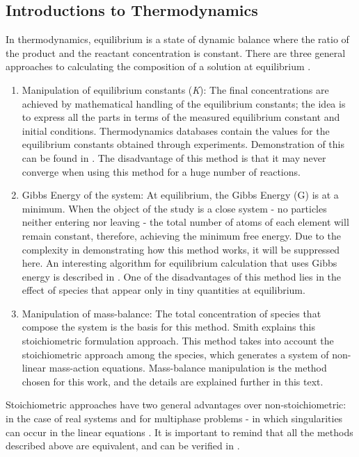 \documentclass[ppgc,mestrado,English]{iiufrgs}
\begin{document}
\subsection{Introductions to Thermodynamics}
In thermodynamics, equilibrium is a state of dynamic balance where the ratio of the product and the reactant concentration is constant. There are three general approaches to calculating the composition of a solution at equilibrium \cite{Petrucci:07}.
\begin{enumerate}
    \item Manipulation of equilibrium constants (\emph{K}): The final concentrations are achieved by mathematical handling of the equilibrium constants; the idea is to express all the parts in terms of the measured equilibrium constant and initial conditions. Thermodynamics databases contain the values for the equilibrium constants obtained through experiments. Demonstration of this can be found in \cite{Kehew:00}. The disadvantage of this method is that it may never converge when using this method for a huge number of reactions.
    \item Gibbs Energy of the system: At equilibrium, the Gibbs Energy (G) is at a minimum. When the object of the study is a close system - no particles neither entering nor leaving - the total number of atoms of each element will remain constant, therefore, achieving the minimum free energy. Due to the complexity in demonstrating how this method works, it will be suppressed here. An interesting algorithm for equilibrium calculation that uses Gibbs energy is described in \cite{Allan:15}. One of the disadvantages of this method lies in the effect of species that appear only in tiny quantities at equilibrium.
    \item Manipulation of mass-balance: The total concentration of species that compose the system is the basis for this method. Smith \cite{Smith:80} explains this stoichiometric formulation approach. This method takes into account the stoichiometric approach among the species, which generates a system of non-linear mass-action equations. Mass-balance manipulation is the method chosen for this work, and the details are explained further in this text.
\end{enumerate}

Stoichiometric approaches have two general advantages over non-stoichiometric: in the case of real systems and for multiphase problems - in which singularities can occur in the linear equations \cite{Smith:80}. It is important to remind that all the methods described above are equivalent, and can be verified in \cite{Zeggeren:70}.
\end{document}
